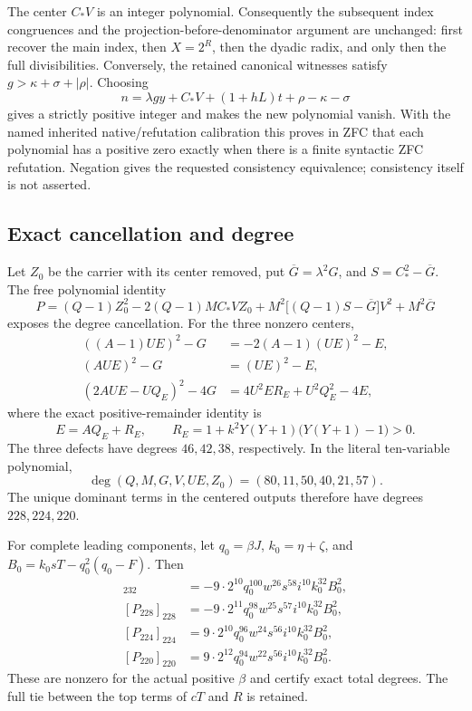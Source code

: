 The center $C_*V$ is an integer polynomial. Consequently the subsequent
index congruences and the projection-before-denominator argument are
unchanged: first recover the main index, then $X=2^R$, then the dyadic
radix, and only then the full divisibilities. Conversely, the retained
canonical witnesses satisfy
$g>\kappa+\sigma+|\rho|$. Choosing
\[
 n=\lambda gy+C_*V+(1+hL)t+\rho-\kappa-\sigma
\]
gives a strictly positive integer and makes the new polynomial vanish.
With the named inherited native/refutation calibration this proves in ZFC
that each polynomial has a positive zero exactly when there is a finite
syntactic ZFC refutation. Negation gives the requested consistency
equivalence; consistency itself is not asserted.

\subsection{Exact cancellation and degree}

Let $Z_0$ be the carrier with its center removed, put
$\overline G=\lambda^2G$, and $S=C_*^2-\overline G$. The free polynomial
identity
\[
 P=(Q-1)Z_0^2-2(Q-1)MC_*VZ_0
   +M^2\bigl[(Q-1)S-\overline G\bigr]V^2+M^2\overline G
\]
exposes the degree cancellation. For the three nonzero centers,
\begin{align*}
 ((A-1)UE)^2-G&=-2(A-1)(UE)^2-E,\\
 (AUE)^2-G&=(UE)^2-E,\\
 (2AUE-UQ_E)^2-4G&=4U^2ER_E+U^2Q_E^2-4E,
\end{align*}
where the exact positive-remainder identity is
\[
 E=AQ_E+R_E,\qquad
 R_E=1+k^2Y(Y+1)\bigl(Y(Y+1)-1\bigr)>0.
\]
The three defects have degrees $46,42,38$, respectively. In the literal
ten-variable polynomial,
\[
 \deg(Q,M,G,V,UE,Z_0)=(80,11,50,40,21,57).
\]
The unique dominant terms in the centered outputs therefore have degrees
$228,224,220$.

For complete leading components, let
$q_0=\beta J$, $k_0=\eta+\zeta$, and
$B_0=k_0sT-q_0^2(q_0-F)$. Then
\begin{align*}
 [P_{232}]_{232}&=-9\cdot2^{10}q_0^{100}w^{26}s^{58}i^{10}k_0^{32}B_0^2,\\
 [P_{228}]_{228}&=-9\cdot2^{11}q_0^{98}w^{25}s^{57}i^{10}k_0^{32}B_0^2,\\
 [P_{224}]_{224}&= 9\cdot2^{10}q_0^{96}w^{24}s^{56}i^{10}k_0^{32}B_0^2,\\
 [P_{220}]_{220}&= 9\cdot2^{12}q_0^{94}w^{22}s^{56}i^{10}k_0^{32}B_0^2.
\end{align*}
These are nonzero for the actual positive $\beta$ and certify exact total
degrees. The full tie between the top terms of $cT$ and $R$ is retained.

